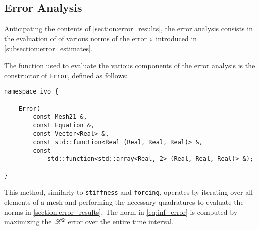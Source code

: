 \newpage
\subsection{Error Analysis}

Anticipating the contents of \cref{section:error_results}, the error analysis consists in the evaluation of of various norms of the error $\varepsilon$ introduced in \cref{subsection:error_estimates}.

The function used to evaluate the various components of the error analysis is the constructor of \lstinline{Error}, defined as follows:
\begin{lstlisting}[style=cpp]
namespace ivo {

    Error(
        const Mesh21 &, 
        const Equation &, 
        const Vector<Real> &, 
        const std::function<Real (Real, Real, Real)> &, 
        const 
            std::function<std::array<Real, 2> (Real, Real, Real)> &);

}
\end{lstlisting}

This method, similarly to \lstinline{stiffness} and \lstinline{forcing}, operates by iterating over all elements of a mesh and performing the necessary quadratures to evaluate the norms in \cref{section:error_results}. The norm in \cref{eq:inf_error} is computed by maximizing the $\mathscr{L}^{2}$ error over the entire time interval.